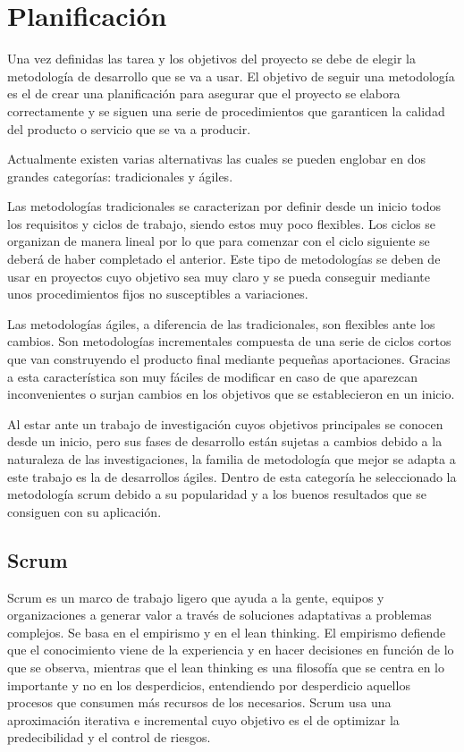 \chapter{Planificación}
Una vez definidas las tarea y los objetivos del proyecto se debe de elegir la metodología de desarrollo que se va a usar. El objetivo de seguir una metodología es el de crear una planificación para asegurar que el proyecto se elabora correctamente y se siguen una serie de procedimientos que garanticen la calidad del producto o servicio que se va a producir. 

Actualmente existen varias alternativas las cuales se pueden englobar en dos grandes categorías: tradicionales y ágiles. 

Las metodologías tradicionales se caracterizan por definir desde un inicio todos los requisitos y ciclos de trabajo, siendo estos muy poco flexibles. Los ciclos se organizan de manera lineal por lo que para comenzar con el ciclo siguiente se deberá de haber completado el anterior. Este tipo de metodologías se deben de usar en proyectos cuyo objetivo sea muy claro y se pueda conseguir mediante unos procedimientos fijos no susceptibles a variaciones.

Las metodologías ágiles, a diferencia de las tradicionales, son flexibles ante los cambios. Son metodologías incrementales compuesta de una serie de ciclos cortos que van construyendo el producto final mediante pequeñas aportaciones. Gracias a esta característica son muy fáciles de modificar en caso de que aparezcan inconvenientes o surjan cambios en los objetivos que se establecieron en un inicio.  

Al estar ante un trabajo de investigación cuyos objetivos principales se conocen desde un inicio, pero sus fases de desarrollo están sujetas a cambios debido a la naturaleza de las investigaciones, la familia de metodología que mejor se adapta a este trabajo es la de desarrollos ágiles. Dentro de esta categoría he seleccionado la metodología scrum debido a su popularidad y a los buenos resultados que se consiguen con su aplicación.
\section{Scrum}
Scrum \cite{book} es un marco de trabajo ligero que ayuda a la gente, equipos y organizaciones a generar valor a través de soluciones adaptativas a problemas complejos. Se basa en el empirismo y en el lean thinking. El empirismo defiende que el conocimiento viene de la experiencia y en hacer decisiones en función de lo que se observa, mientras que el lean thinking es una filosofía que se centra en lo importante y no en los desperdicios, entendiendo por desperdicio aquellos procesos que consumen más recursos de los necesarios. Scrum usa una aproximación iterativa e incremental cuyo objetivo es el de optimizar la predecibilidad y el control de riesgos. 

